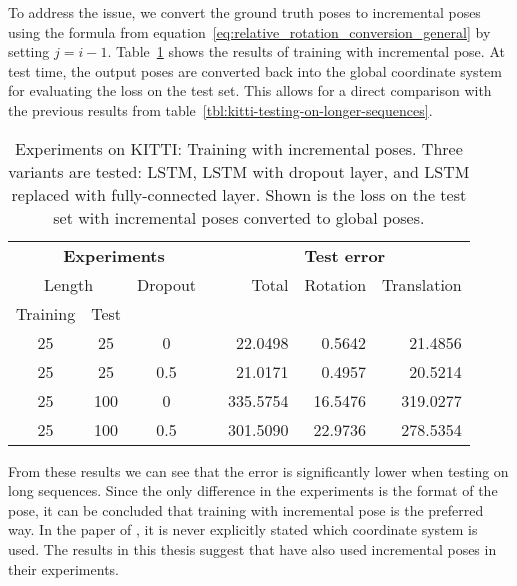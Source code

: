 		To address the issue, we convert the ground truth poses to incremental poses using the formula from equation~\ref{eq:relative_rotation_conversion_general} by setting $j = i - 1$.
		Table~\ref{tbl:kitti-incremental-pose-and-lstm-removal} shows the results of training with incremental pose.
		At test time, the output poses are converted back into the global coordinate system for evaluating the loss on the test set.
		This allows for a direct comparison with the previous results from table~\ref{tbl:kitti-testing-on-longer-sequences}.
		\begin{table}[tb]
			\small
			\begin{center}
				\begin{tabular}{ccccrrr}
					\toprule
					\multicolumn{4}{c}{\textbf{Experiments}}		& \multicolumn{3}{c}{\textbf{Test error}} 		\\
					\cmidrule(lr){1-4} 	\cmidrule(lr){5-7}
					\multicolumn{2}{c}{Length} & Dropout &	& Total & Rotation & Translation	\\ 
					Training & Test & & & & & \\
					\midrule
					25 & 25		& 0				& 	& 22.0498	& 0.5642	& 21.4856 		\\ 
					25 & 25		& 0.5			& 	& 21.0171	& 0.4957	& 20.5214		\\ 
					\midrule
					25 & 100	& 0			 	& 	& 335.5754	& 16.5476	& 319.0277 		\\ 
					25 & 100	& 0.5		 	& 	& 301.5090	& 22.9736	& 278.5354		\\ 
					\bottomrule
				\end{tabular}
			\end{center}
			\caption[Experiments on KITTI: Training with incremental poses]
					{Experiments on KITTI: Training with incremental poses.
					 Three variants are tested: LSTM, LSTM with dropout layer, and LSTM replaced with fully-connected layer.
					 Shown is the loss on the test set with incremental poses converted to global poses.
					 \label{tbl:kitti-incremental-pose-and-lstm-removal}}
		\end{table}
		From these results we can see that the error is significantly lower when testing on long sequences.
		Since the only difference in the experiments is the format of the pose, it can be concluded that training with incremental pose is the preferred way.
		In the paper of \cite{wang2017deepvo}, it is never explicitly stated which coordinate system is used.
		The results in this thesis suggest that \citeauthor{wang2017deepvo} have also used incremental poses in their experiments.
		
